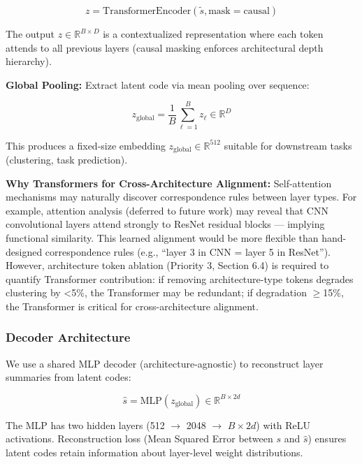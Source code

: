 \begin{equation}
z = \text{TransformerEncoder}(\tilde{s}, \text{mask}=\text{causal})
\end{equation}

The output $z \in \mathbb{R}^{B \times D}$ is a contextualized representation where each token attends to all previous layers (causal masking enforces architectural depth hierarchy).

\textbf{Global Pooling:} Extract latent code via mean pooling over sequence:

\begin{equation}
z_{\text{global}} = \frac{1}{B} \sum_{\ell=1}^B z_\ell \in \mathbb{R}^D
\end{equation}

This produces a fixed-size embedding $z_{\text{global}} \in \mathbb{R}^{512}$ suitable for downstream tasks (clustering, task prediction).

\textbf{Why Transformers for Cross-Architecture Alignment:} Self-attention mechanisms may naturally discover correspondence rules between layer types. For example, attention analysis (deferred to future work) may reveal that CNN convolutional layers attend strongly to ResNet residual blocks --- implying functional similarity. This learned alignment would be more flexible than hand-designed correspondence rules (e.g., ``layer 3 in CNN = layer 5 in ResNet''). However, architecture token ablation (Priority 3, Section 6.4) is required to quantify Transformer contribution: if removing architecture-type tokens degrades clustering by <5\%, the Transformer may be redundant; if degradation $\geq$15\%, the Transformer is critical for cross-architecture alignment.

\subsubsection{Decoder Architecture}

We use a shared MLP decoder (architecture-agnostic) to reconstruct layer summaries from latent codes:

\begin{equation}
\hat{s} = \text{MLP}(z_{\text{global}}) \in \mathbb{R}^{B \times 2d}
\end{equation}

The MLP has two hidden layers (512 $\rightarrow$ 2048 $\rightarrow$ $B \times 2d$) with ReLU activations. Reconstruction loss (Mean Squared Error between $s$ and $\hat{s}$) ensures latent codes retain information about layer-level weight distributions.

